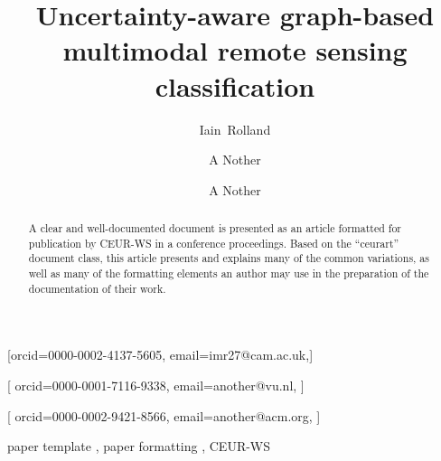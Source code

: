 \documentclass[
twocolumn,
]{ceurart}
\begin{document}


\title{Uncertainty-aware graph-based multimodal remote sensing classification}
%

\author[1]{Iain~Rolland}[orcid=0000-0002-4137-5605, email=imr27@cam.ac.uk,]

\address[1]{Department of Engineering, University of Cambridge, Cambridge, CB2 1PZ United Kingdom}
\address[2]{Joint Institute for Nuclear Research, 6 Joliot-Curie, Dubna, Moscow region, 141980, Russian Federation}

\author[2]{A Nother}[%
orcid=0000-0001-7116-9338,
email=another@vu.nl,
]
\address[3]{Vrije Universiteit Amsterdam, De Boelelaan 1105, 1081 HV Amsterdam, The Netherlands}

\author[3]{A Nother}[%
orcid=0000-0002-9421-8566,
email=another@acm.org,
]

\begin{abstract}
  A clear and well-documented document is presented as an
  article formatted for publication by CEUR-WS in a conference
  proceedings. Based on the ``ceurart'' document class, this article
  presents and explains many of the common variations, as well as many
  of the formatting elements an author may use in the preparation of
  the documentation of their work.
\end{abstract}

\begin{keywords}
  paper template \sep
  paper formatting \sep
  CEUR-WS
\end{keywords}

\maketitle
\end{document}
